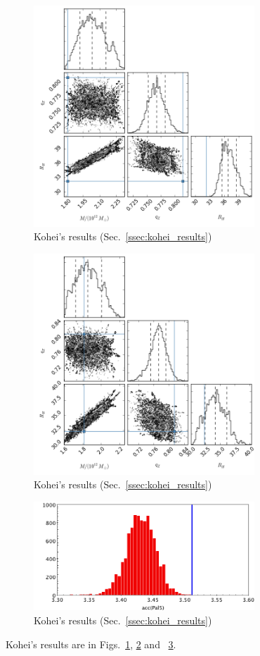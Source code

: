 \begin{figure}
\includegraphics[width=83mm]{figures/kohei_results1.png}
  \caption{Kohei's results (Sec.~\ref{ssec:kohei_results})}
  \label{plot_kohei_results1}
\end{figure}

\begin{figure}
\includegraphics[width=83mm]{figures/kohei_results2.png}
  \caption{Kohei's results (Sec.~\ref{ssec:kohei_results})}
  \label{plot_kohei_results2}
\end{figure}

\begin{figure}
\includegraphics[width=83mm]{figures/kohei_acc.png}
  \caption{Kohei's results (Sec.~\ref{ssec:kohei_results})}
  \label{plot_kohei_acc}
\end{figure}

Kohei's results are in Figs.~\ref{plot_kohei_results1}, \ref{plot_kohei_results2} and ~\ref{plot_kohei_acc}.
